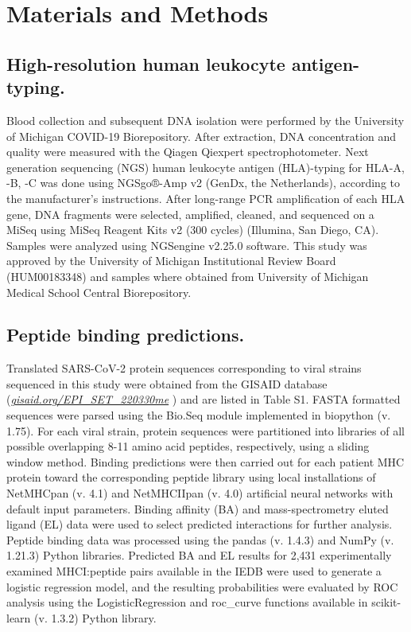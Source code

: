 \documentclass[utf8]{frontiersinFPHY_FAMS} %
\begin{document}
\section*{Materials and Methods}

\subsection*{High-resolution human leukocyte antigen-typing.} Blood collection and subsequent DNA isolation were performed by the University of Michigan COVID-19 Biorepository.  After extraction, DNA concentration and quality were measured with the Qiagen Qiexpert spectrophotometer.  Next generation sequencing (NGS) human leukocyte antigen (HLA)-typing for HLA-A, -B, -C was done using NGSgo®-Amp v2 (GenDx, the Netherlands), according to the manufacturer’s instructions.  After long-range PCR amplification of each HLA gene, DNA fragments were selected, amplified, cleaned, and sequenced on a MiSeq using MiSeq Reagent Kits v2 (300 cycles) (Illumina, San Diego, CA). Samples were analyzed using NGSengine v2.25.0 software. This study was approved by the University of Michigan Institutional Review Board (HUM00183348) and samples where obtained from University of Michigan Medical School Central Biorepository.  

\subsection*{Peptide binding predictions.} Translated SARS-CoV-2 protein sequences corresponding to viral strains sequenced in this study were obtained from the GISAID database (\textit{\href{https://gisaid.org/EPI_SET_220330me}{gisaid.org/EPI\_SET\_220330me}} ) \cite{34934514} and are listed in Table S1. FASTA formatted sequences were parsed using the Bio.Seq module implemented in biopython (v. 1.75). For each viral strain, protein sequences were partitioned into libraries of all possible overlapping 8-11 amino acid peptides, respectively, using a sliding window method. Binding predictions were then carried out for each patient MHC protein toward the corresponding peptide library using local installations of NetMHCpan (v. 4.1) and NetMHCIIpan (v. 4.0) artificial neural networks \citep{32406916} with default input parameters. Binding affinity (BA) and mass-spectrometry eluted ligand (EL) data were used to select predicted interactions for further analysis. Peptide binding data was processed using the pandas (v. 1.4.3) and NumPy (v. 1.21.3) Python libraries. Predicted BA and EL results for 2,431 experimentally examined MHCI:peptide pairs available in the IEDB were used to generate a logistic regression model, and the resulting probabilities were evaluated by ROC analysis using the LogisticRegression and roc\_curve functions available in scikit-learn (v. 1.3.2) Python library.
\end{document}
